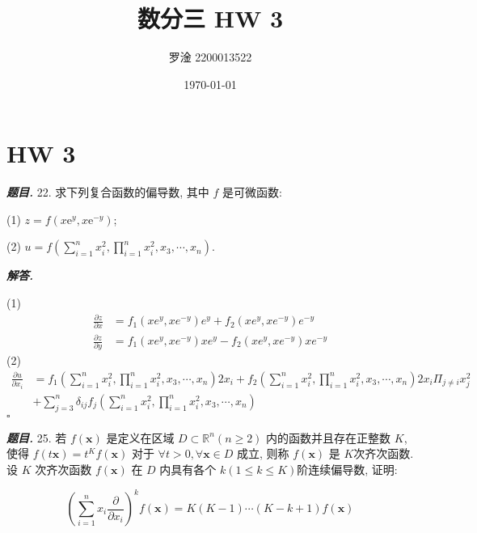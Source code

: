\documentclass[10pt, a4paper, oneside]{ctexart}
\title{\textbf{数分三 HW 3}}
\author{罗淦 2200013522}
\date{\today}
\newenvironment{problem}{\begin{framed}\par\noindent\textbf{\textit{题目. }}}{\end{framed}\par}
\newenvironment{solution}{%
  \par\noindent\textbf{\textit{解答. }}\ignorespaces
}{%
  \hfill\ensuremath{\square}\par %
}
\begin{document}
\maketitle


\section{HW 3}
\begin{problem}
    22. 求下列复合函数的偏导数, 其中 $f$ 是可微函数:
    
    (1) $z=f\left(x \mathrm{e}^y, x \mathrm{e}^{-y}\right)$;
    
    (2) $u=f\left(\sum_{i=1}^n x_i^2, \prod_{i=1}^n x_i^2, x_3, \cdots, x_n\right)$.
    \end{problem}
    
    \begin{solution}
    (1)
    \begin{align*}
        \frac{\partial z}{\partial x}&=f_1(xe^y,xe^{-y})e^y+f_2(xe^y,xe^{-y})e^{-y}\\
        \frac{\partial z}{\partial y}&=f_1(xe^y,xe^{-y})xe^y-f_2(xe^y,xe^{-y})xe^{-y}
    \end{align*}
    (2)
    \begin{align*}
        \frac{\partial u}{\partial x_i}&=f_1(\sum_{i=1}^n x_i^2, \prod_{i=1}^n x_i^2, x_3, \cdots, x_n)2x_i+f_2(\sum_{i=1}^n x_i^2, \prod_{i=1}^n x_i^2, x_3, \cdots, x_n)2x_i\Pi_{j\neq i}x_j^2\\&+\sum_{j=3}^{n}\delta_{ij}f_j(\sum_{i=1}^n x_i^2, \prod_{i=1}^n x_i^2, x_3, \cdots, x_n)
    \end{align*}
    \end{solution}
    
    \begin{problem}
        25. 若 $f(\boldsymbol{x})$ 是定义在区域 $D \subset \mathbb{R}^n(n \geqslant 2)$ 内的函数并且存在正整数 $K$, 使得 $f(t \boldsymbol{x})=t^K f(\boldsymbol{x})$ 对于 $\forall t>0, \forall \boldsymbol{x} \in D$ 成立, 则称 $f(\boldsymbol{x})$ 是 $K$次齐次函数. 设 $K$ 次齐次函数 $f(\boldsymbol{x})$ 在 $D$ 内具有各个 $k(1 \leqslant k \leqslant K)$阶连续偏导数, 证明:
    
        $$
        \left(\sum_{i=1}^n x_i \frac{\partial}{\partial x_i}\right)^k f(\boldsymbol{x})=K(K-1) \cdots(K-k+1) f(\boldsymbol{x})
        $$
    \end{problem}
    
\end{document}
